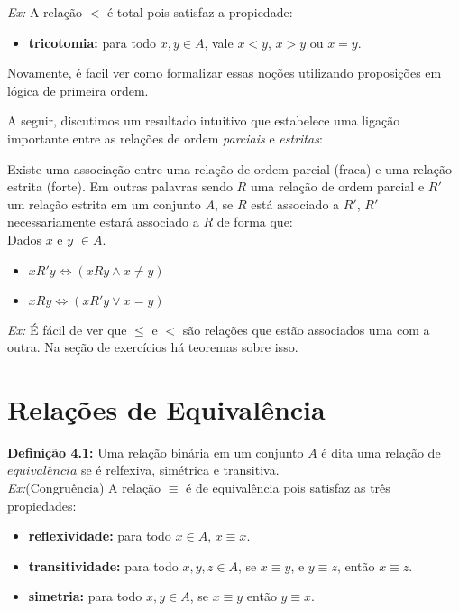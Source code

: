     \textit{Ex:} A relação $<$ é total pois satisfaz a propiedade:
    
    \begin{itemize}
        \item \textbf{tricotomia:} para todo $x,y \in A$, vale $x<y$, $x>y$ ou $x=y$.
    \end{itemize}

\noindent Novamente, é facil ver como formalizar essas noções utilizando proposições em lógica de primeira ordem.


A seguir, discutimos um resultado intuitivo que estabelece uma ligação importante entre as relações de ordem \textit{parciais} e \textit{estritas}:

Existe uma associação entre uma relação de ordem parcial (fraca) e uma relação estrita (forte). Em outras palavras sendo $R$ uma relação de ordem parcial e $R'$ um relação estrita em um conjunto $A$, se $R$ está associado a $R'$, $R'$ necessariamente estará associado a $R$ de forma que:\\

Dados $x$ e $y$ $\in A$.
\begin{itemize}
    \item $xR'y \Leftrightarrow (xRy \wedge x \neq y)$
    \item $xRy \Leftrightarrow (xR'y \vee  x = y)$
\end{itemize}

\textit{Ex:} É fácil de ver que $\leq$ e $<$ são relações que estão associados uma com a outra. Na seção de exercícios há teoremas sobre isso.



\section{Relações de Equivalência}

\textbf{Definição 4.1:} Uma relação binária em um conjunto $A$ é dita uma relação de $equival\hat{e}ncia$ se é relfexiva, simétrica e transitiva.\\

\textit{Ex:}(Congruência) A relação $\equiv$ é de equivalência pois satisfaz as três propiedades:

\begin{itemize}
        \item \textbf{reflexividade:} para todo $x \in A$, $x\equiv x$.
        \item \textbf{transitividade:} para todo $x,y,z \in A$, se $x \equiv y$, e $y \equiv z$, então $x\equiv z$.
        \item \textbf{simetria:} para todo $x,y \in A$, se $x\equiv y$ então $y \equiv x$.
    \end{itemize}

